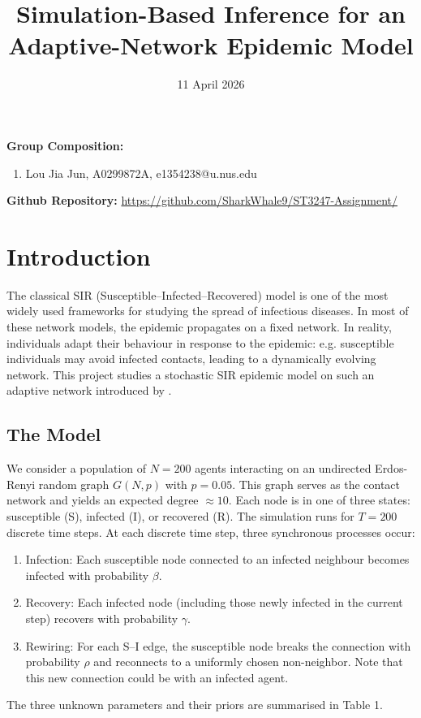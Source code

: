 \documentclass[12pt, a4paper]{article}
\begin{document}
	
\title{Simulation-Based Inference for an Adaptive-Network Epidemic Model}
\date{11 April 2026}
\maketitle

{\bf Group Composition:}
\begin{enumerate}
    \item Lou Jia Jun, A0299872A, e1354238@u.nus.edu
\end{enumerate}

{\bf Github Repository:} \url{https://github.com/SharkWhale9/ST3247-Assignment/}

\section{Introduction}
The classical SIR (Susceptible–Infected–Recovered) model is one of the most widely used frameworks for studying the spread of infectious diseases. In most of these network models, the epidemic propagates on a fixed network. In reality, individuals adapt their behaviour in response to the epidemic: e.g. susceptible individuals may avoid infected contacts, leading to a dynamically evolving network. This project studies a stochastic SIR epidemic model on such an adaptive network introduced by \citet{gross2006epidemic}.

\subsection{The Model}
We consider a population of $N = 200$ agents interacting on an undirected Erdos-Renyi random graph $G(N,p)$ with $p=0.05$. This graph serves as the contact network and yields an expected degree $\approx 10$. Each node is in one of three states: susceptible (S), infected (I), or recovered (R). The simulation runs for $T=200$ discrete time steps. At each discrete time step, three synchronous processes occur:
\begin{enumerate}
    \item Infection: Each susceptible node connected to an infected neighbour becomes infected with probability $\beta$.
    \item Recovery: Each infected node (including those newly infected in the current step) recovers with probability $\gamma$.
    \item Rewiring: For each S–I edge, the susceptible node breaks the connection with probability $\rho$ and reconnects to a uniformly chosen non-neighbor. Note that this new connection could be with an infected agent.
\end{enumerate}
The three unknown parameters and their priors are summarised in Table 1.
\end{document}
